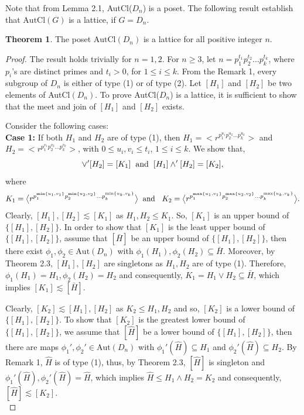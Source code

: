 \documentclass{article}
\theoremstyle{definition}
\newtheorem{theorem}{Theorem}[section]
\begin{document}
Note that from Lemma 2.1, AutCl($D_n$) is a poset. The following result establish that $\text{AutCl}(G)$ is a lattice, if $G=D_n$.
\begin{theorem}
    The poset $\text{AutCl}(D_n)$ is a lattice for all positive integer $n$. 
    \end{theorem}
\begin{proof}
     The result holds trivially for $n=1,2$. For $n\ge 3$, let $n=p_1^{t_1}p_2^{t_2}\dots p_k^{t_k}$, where $p_i$'s are distinct primes and $t_i > 0$, for $1\le i \le k$. From the Remark 1, every subgroup of $D_n$ is either of type (1) or of type (2). Let $[H_1]$ and $[H_2]$ be two elements of AutCl$(D_n)$.  To prove AutCl($D_n$) is a lattice, it is sufficient to show that the meet and join of $[H_1]$ and $[H_2]$ exists.\par Consider the following cases: \vspace{0.2cm} \\
\textbf{Case 1:} If both $H_1$ and $H_2$ are of type (1), then $H_1=\bigl<r^{p_1^{u_1}p_2^{u_2}\dots p_k^{u_k}}\bigr>$ and $H_2=\bigl<r^{p_1^{v_1}p_2^{v_2}\dots p_k^{v_k}}\bigr>$, with $0\le u_i, v_i\le t_i$, $1\le i \le k$. We show that,
\begin{equation*}
    [H_1]\vee' [H_2]=[K_1] \hspace{0.2cm} \text{and} \hspace{0.2cm} [H_1]\wedge' [H_2]=[K_2],
\end{equation*}
where 
\begin{equation*}
 K_1=   \bigl<r^{p_1^{\text{min}\{u_1,v_1\}}p_2^{\text{min}\{u_2,v_2\}}\dots p_k^{\text{min}\{u_k,v_k\}}}\bigr> \hspace{0.2cm} \text{and }\hspace{0.2cm} K_2=\bigl<r^{p_1^{\text{max}\{u_1,v_1\}}p_2^{\text{max}\{u_2,v_2\}}\dots p_k^{\text{max}\{u_k,v_k\}}}\bigr>. 
\end{equation*}
Clearly, $[H_1],[H_2]\lesssim[K_1]$ as $H_1, H_2\le K_1$. So, $[K_1]$ is an upper bound of $\{[H_1],[H_2]\}$. In order to show that $[K_1]$ is the least upper bound of $\{[H_1],[H_2]\}$, assume that $[\bar H]$ be an upper bound of $\{[H_1],[H_2]\}$, then there exist $\phi_1,\phi_2 \in \text{Aut}(D_n)$ with $\phi_1(H_1), \phi_2(H_2)\subseteq \bar H$. Moreover, by Theorem 2.3, $[H_1],[H_2]$ are singletons as $H_1, H_2$ are of type (1). Therefore, $\phi_1(H_1)=H_1, \phi_2(H_2)=H_2$ and consequently, $K_1=H_1 \vee H_2 \subseteq \bar H$, which implies $[K_1]\lesssim [\bar H]$.  \par
Clearly, $[K_2]\lesssim [H_1], [H_2]$ as $K_2\le H_1, H_2$ and so, $[K_2]$ is a lower bound of $\{[H_1],[H_2]\}$. To show that $[K_2]$ is the greatest lower bound of $\{[H_1],[H_2]\}$, we assume that $[\widehat H]$ be a lower bound of  $\{[H_1],[H_2]\}$, then there are maps $\phi_1',\phi_2'\in \text{Aut}(D_n)$ with $\phi_1'(\widehat H)\subseteq H_1$ and $\phi_2' (\widehat H)\subseteq H_2$. By Remark 1, $\widehat H$ is of type (1), thus, by Theorem 2.3, $[\widehat H]$ is singleton and $\phi_1'(\widehat H),\phi_2'(\widehat H)=\widehat H$, which implies $\widehat H \le H_1\wedge H_2 =K_2$ and consequently, $[\widehat H]\lesssim [K_2]$. \vspace{0.2cm}\\

\end{proof}
\end{document}
